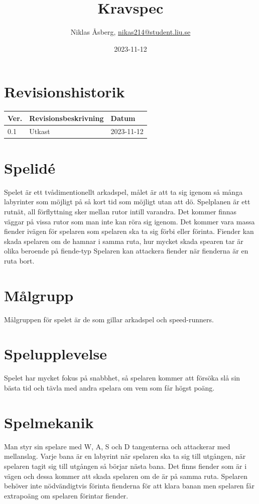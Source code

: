 \documentclass{TDP005mall}
\author{Niklas Åsberg, \url{nikas214@student.liu.se}}
\title{Kravspec}
\date{2023-11-12}
\begin{document}
\projectpage
\section{Revisionshistorik}
\begin{table}[!h]
\begin{tabularx}{\linewidth}{|l|X|l|}
\hline
Ver. & Revisionsbeskrivning & Datum \\\hline
0.1 & Utkast & 2023-11-12 \\\hline
\end{tabularx}
\end{table}

\tableofcontents
\newpage

\section{Spelidé}
Spelet är ett tvådimentionellt arkadspel, målet är att ta sig igenom så många labyrinter som möjligt på så kort tid som möjligt utan att dö.
Spelplanen är ett rutnät, all förflyttning sker mellan rutor intill varandra. Det kommer finnas väggar på vissa rutor som man inte kan röra sig igenom.
Det kommer vara massa fiender ivägen för spelaren som spelaren ska ta sig förbi eller förinta. Fiender kan skada spelaren om de hamnar i samma ruta, hur mycket skada spearen tar är olika beroende på fiende-typ
Spelaren kan attackera fiender när fienderna är en ruta bort.

\section{Målgrupp}
Målgruppen för spelet är de som gillar arkadspel och speed-runners.

\section{Spelupplevelse}
Spelet har mycket fokus på snabbhet, så spelaren kommer att försöka slå sin bästa tid och tävla med andra spelara om vem som får högst poäng.

\section{Spelmekanik}
Man styr sin spelare med W, A, S och D tangenterna och attackerar med mellanslag. Varje bana är en labyrint när spelaren ska ta sig till utgången, när spelaren tagit sig till utgången så börjar nästa bana.
Det finns fiender som är i vägen och dessa kommer att skada spelaren om de är på samma ruta.
Spelaren behöver inte nödvändigtvis förinta fienderna för att klara banan men spelaren får extrapoäng om spelaren förintar fiender.
\end{document}
